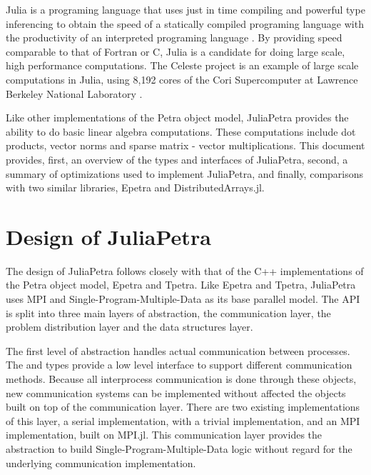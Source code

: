 \documentclass[acmsmall]{acmart}
\newcommand{\snippet}[1]{\texttt{\detokenize{#1}}}
\begin{document}
Julia is a programing language that uses just in time compiling and powerful type inferencing
to obtain the speed of a statically compiled programing language with the productivity of an
interpreted programing language \cite{Bezanson:2017:FreshApproach}.
By providing speed comparable to that of Fortran or C, Julia is a candidate for doing large scale,
high performance computations.
The Celeste project is an example of large scale computations in Julia,
using 8,192 cores of the Cori Supercomputer
at Lawrence Berkeley National Laboratory \cite{Bezanson:2017:FreshApproach}.

Like other implementations of the Petra object model,
JuliaPetra provides the ability to do basic linear algebra computations.
These computations include dot products, vector norms and sparse matrix - vector multiplications.
This document provides, first, an overview of the types and interfaces of JuliaPetra,
second, a summary of optimizations used to implement JuliaPetra,
and finally, comparisons with two similar libraries, Epetra and DistributedArrays.jl.

\section{Design of JuliaPetra}

The design of JuliaPetra follows closely with that of the C++ implementations of the
Petra object model, Epetra and Tpetra.
Like Epetra and Tpetra, JuliaPetra uses MPI and Single-Program-Multiple-Data as its base parallel model.
The API is split into three main layers of abstraction, the communication layer, the problem distribution layer and the data structures layer.

The first level of abstraction handles actual communication between processes.
The \snippet{Comm} and \snippet{Distributor} types provide a low level interface to support different communication methods.
Because all interprocess communication is done through these objects, new communication systems can be implemented without affected the objects built on top of the communication layer.
There are two existing implementations of this layer, a serial implementation, with a trivial implementation, and an MPI implementation, built on MPI.jl\cite{Github:MPI}.
This communication layer provides the abstraction to build Single-Program-Multiple-Data logic without regard for the underlying communication implementation.
\end{document}
